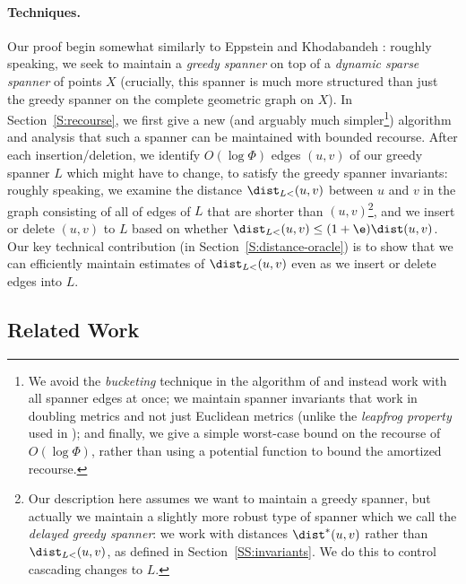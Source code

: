 \paragraph{Techniques.} Our proof begin somewhat similarly to Eppstein and Khodabandeh \cite{EK24}: roughly speaking, we seek to maintain a \emph{greedy spanner} on top of a \emph{dynamic sparse spanner} of points $X$ (crucially, this spanner is much more structured than just the greedy spanner on the complete geometric graph on $X$). In Section~\ref{S:recourse}, we first give a new (and arguably much simpler\footnote{We avoid the \emph{bucketing} technique in the algorithm of \cite{EK24} and instead work with all spanner edges at once; we maintain spanner invariants that work in doubling metrics and not just Euclidean metrics (unlike the \emph{leapfrog property} used in \cite{EK24}); and finally, we give a simple worst-case bound on the recourse of $O(\log \Phi)$, rather than using a potential function to bound the amortized recourse.}) algorithm and analysis that such a spanner can be maintained with bounded recourse.
After each insertion/deletion, we identify $O(\log \Phi)$ edges $(u,v)$ of our greedy spanner $L$ which might have to change, to satisfy the greedy spanner invariants: roughly speaking, we examine the distance $\dist_{L<}(u,v)$ between $u$ and $v$ in the graph consisting of all of edges of $L$ that are shorter than $(u,v)$\footnote{Our description here assumes we want to maintain a greedy spanner, but actually we maintain a slightly more robust type of spanner which we call the \emph{delayed greedy spanner}: we work with distances $\dist^*(u,v)$ rather than $\dist_{L<}(u,v)$, as defined in Section~\ref{SS:invariants}. We do this to control cascading changes to $L$.}, and we insert or delete $(u,v)$ to $L$ based on whether $\dist_{L<}(u,v) \le (1+\e) \dist(u,v)$. Our key technical contribution  (in Section~\ref{S:distance-oracle}) is to show that we can efficiently maintain estimates of $\dist_{L<}(u,v)$ even as we insert or delete edges into $L$.
%
%
%
\subsection{Related Work} 
\label{SS:related-work}
%
